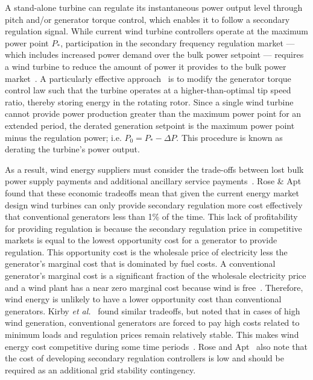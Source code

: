 A stand-alone turbine can regulate its instantaneous power output level through pitch and/or generator torque control, which enables it to follow a secondary regulation signal. While current wind turbine controllers operate at the maximum power point $P_*$, participation in the secondary frequency regulation market --- which includes increased power demand over the bulk power setpoint --- requires a wind turbine to reduce the amount of power it provides to the bulk power market~\cite{Aho2012a, Rose2014a, Kirby2010a, Aho2013a, Jeong2014a, Fleming2016a}. A particularly effective approach~\cite{Aho2013a} is to modify the generator torque control law such that the turbine operates at a higher-than-optimal tip speed ratio, thereby storing energy in the rotating rotor. Since a single wind turbine cannot provide power production greater than the maximum power point for an extended period, the derated generation setpoint is the maximum power point minus the regulation power; i.e. $P_0 = P_* - \Delta P$. This procedure is known as derating the turbine's power output. 

As a result, wind energy suppliers must consider the trade-offs between lost bulk power supply payments and additional ancillary service payments~\cite{Rose2014a, Kirby2010a}. Rose \& Apt~\cite{Rose2014a} found that these economic tradeoffs mean that given the current energy market design wind turbines can only provide secondary regulation more cost effectively that conventional generators less than 1\% of the time. This lack of profitability for providing regulation is because the secondary regulation price in competitive markets is equal to the lowest opportunity cost for a generator to provide regulation. This opportunity cost is the wholesale price of electricity less the generator's marginal cost that is dominated by fuel costs. A conventional generator's marginal cost is a significant fraction of the wholesale electricity price and a wind plant has a near zero marginal cost because wind is free~\cite{Rose2014a}. Therefore, wind energy is unlikely to have a lower opportunity cost than conventional generators. Kirby \textit{et al.}~\cite{Kirby2010a} found similar tradeoffs, but noted that in cases of high wind generation, conventional generators are forced to pay high costs related to minimum loads and regulation prices remain relatively stable. This makes wind energy cost competitive during some time periods~\cite{Kirby2010a}. Rose and Apt~\cite{Rose2014a} also note that the cost of developing secondary regulation controllers is low and should be required as an additional grid stability contingency. 

